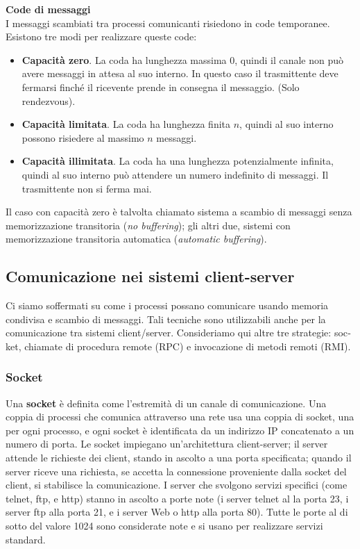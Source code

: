 \documentclass[11pt,a4paper]{article}
\begin{document}
%
\textbf{Code di messaggi}\\
I messaggi scambiati tra processi comunicanti risie­dono in code temporanee.
Esistono tre modi per realizzare queste code:
\begin{itemize}[leftmargin=*]
  \item \textbf{Capacità zero}. La coda ha lunghezza massima 0, quindi il canale non può avere mes­saggi in attesa al suo interno. In questo caso il trasmittente deve fermarsi finché il rice­vente prende in consegna il messaggio. (Solo rendezvous).
  \item \textbf{Capacità limitata}. La coda ha lunghezza finita $n$, quindi al suo interno possono risie­dere al massimo $n$ messaggi.
  \item \textbf{Capacità illimitata}. La coda ha una lunghezza potenzialmente infinita, quindi al suo in­terno può attendere un numero indefinito di messaggi. Il trasmittente non si ferma mai.
\end{itemize}
%
Il caso con capacità zero è talvolta chiamato sistema a scambio di messaggi senza memoriz­zazione transitoria (\emph{no buffering}); gli altri due, sistemi con memorizzazione transitoria auto­matica (\emph{automatic buffering}).

\subsection{Comunicazione nei sistemi client-server}
Ci siamo soffermati su come i processi possano comunicare usando me­moria condivisa e scambio di messaggi. Tali tecniche sono utilizzabili anche per la comuni­cazione tra sistemi client/server. Consideriamo qui altre tre strategie: soc­ket, chiamate di procedura remote (RPC) e invocazione di metodi remoti (RMI).

\subsubsection{Socket}
Una \textbf{socket} è definita come l'estremità di un canale di comunicazione. Una coppia di proces­si che comunica attraverso una rete usa una coppia di socket, una per ogni processo, e ogni
socket è identificata da un indirizzo IP concatenato a un numero di porta. Le
socket impiegano un'architettura client-server; il server attende le richieste dei client, stando
in ascolto a una porta specificata; quando il server riceve una richiesta, se accetta la connes­sione proveniente dalla socket del client, si stabilisce la comunicazione. I server che svolgo­no servizi specifici (come telnet, ftp, e http) stanno in ascolto a porte note (i server telnet al­
la porta 23, i server ftp alla porta 21, e i server Web o http alla porta 80). Tutte le porte al di
sotto del valore 1024 sono considerate note e si usano per realizzare servizi standard.
\end{document}
